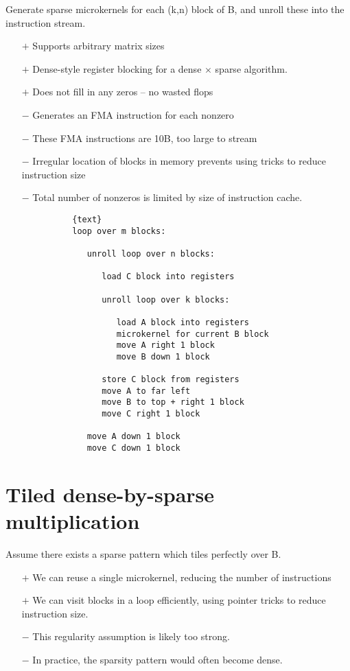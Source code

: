 Generate sparse microkernels for each (k,n) block of B, and unroll these into the instruction stream.
\begin{itemize}
      \item[$+$] Supports arbitrary matrix sizes
      \item[$+$] Dense-style register blocking for a dense $\times$ sparse algorithm.
      \item[$+$] Does not fill in any zeros -- no wasted flops

      \item[$-$] Generates an FMA instruction for each nonzero
      \item[$-$] These FMA instructions are 10B, too large to stream
      \item[$-$] Irregular location of blocks in memory prevents using tricks to reduce instruction size
      \item[$-$] Total number of nonzeros is limited by size of instruction cache.

\end{itemize}
\begin{figure}[ht]
      \begin{verbatim}
        {text}
        loop over m blocks:

           unroll loop over n blocks:

              load C block into registers

              unroll loop over k blocks:

                 load A block into registers
                 microkernel for current B block
                 move A right 1 block
                 move B down 1 block

              store C block from registers
              move A to far left
              move B to top + right 1 block
              move C right 1 block

           move A down 1 block
           move C down 1 block
      \end{verbatim}
\end{figure}


\section{Tiled dense-by-sparse multiplication}

        Assume there exists a sparse pattern which tiles perfectly over B.
        \begin{itemize}
        \item[$+$] We can reuse a single microkernel, reducing the number of instructions
        \item[$+$] We can visit blocks in a loop efficiently, using pointer tricks to reduce instruction size.
        \item[$-$] This regularity assumption is likely too strong.
        \item[$-$] In practice, the sparsity pattern would often become dense.
        \end{itemize}


